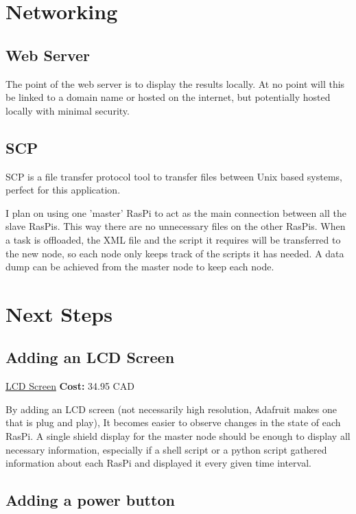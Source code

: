\documentclass{report}
\begin{document}
\section{Networking}

\subsection{Web Server}

The point of the web server is to display the results locally. At no point will this be linked to a domain name or hosted on the internet, but potentially hosted locally with minimal security. 


\subsection{SCP}

SCP is a file transfer protocol tool to transfer files between Unix based systems, perfect for this application.

I plan on using one 'master' RasPi to act as the main connection between all the slave RasPis. This way there are no unnecessary files on the other RasPis. When a task is offloaded, the XML file and the script it requires will be transferred to the new node, so each node only keeps track of the scripts it has needed. A data dump can be achieved from the master node to keep each node.

\section{Next Steps}

\subsection{Adding an LCD Screen}

\noindent\href{https://www.adafruit.com/product/1601}{LCD Screen}
{\bf Cost: } 34.95 CAD

By adding an LCD screen (not necessarily high resolution, Adafruit makes one that is plug and play), It becomes easier to observe changes in the state of each RasPi. A single shield display for the master node should be enough to display all necessary information, especially if a shell script or a python script gathered information about each RasPi and displayed it every given time interval. 

\subsection{Adding a power button}
\end{document}
